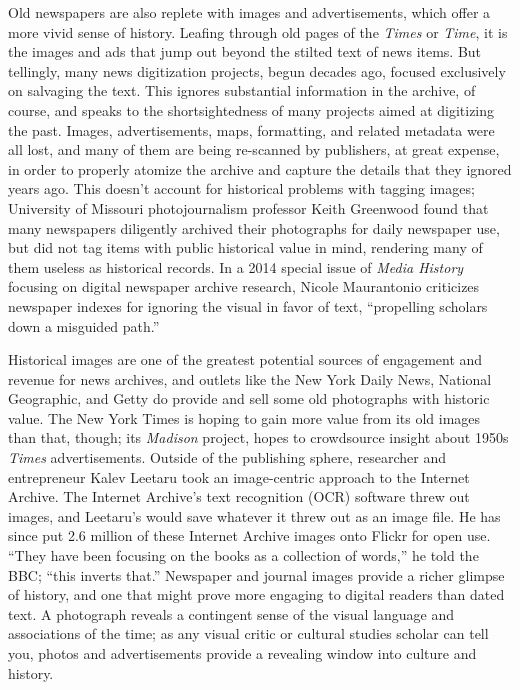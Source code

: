 Old newspapers are also replete with images and advertisements, which offer a more vivid sense of history. Leafing through old pages of the \emph{Times} or \emph{Time}, it is the images and ads that jump out beyond the stilted text of news items. But tellingly, many news digitization projects, begun decades ago, focused exclusively on salvaging the text. This ignores substantial information in the archive, of course, and speaks to the shortsightedness of many projects aimed at digitizing the past. Images, advertisements, maps, formatting, and related metadata were all lost, and many of them are being re-scanned by publishers, at great expense, in order to properly atomize the archive and capture the details that they ignored years ago. This doesn't account for historical problems with tagging images; University of Missouri photojournalism professor Keith Greenwood found that many newspapers diligently archived their photographs for daily newspaper use, but did not tag items with public historical value in mind, rendering many of them useless as historical records.\autocite{greenwood_digital_2011} In a 2014 special issue of \emph{Media History} focusing on digital newspaper archive research, Nicole Maurantonio criticizes newspaper indexes for ignoring the visual in favor of text, ``propelling scholars down a misguided path.''\autocite[90]{maurantonio_archiving_2014}

Historical images are one of the greatest potential sources of engagement and revenue for news archives, and outlets like the New York Daily News, National Geographic, and Getty do provide and sell some old photographs with historic value. The New York Times is hoping to gain more value from its old images than that, though; its \emph{Madison} project, hopes to crowdsource insight about 1950s \emph{Times} advertisements.\autocite{_new_????} Outside of the publishing sphere, researcher and entrepreneur Kalev Leetaru took an image-centric approach to the Internet Archive. The Internet Archive's text recognition (OCR) software threw out images, and Leetaru's would save whatever it threw out as an image file. He has since put 2.6 million of these Internet Archive images onto Flickr for open use. ``They have been focusing on the books as a collection of words,'' he told the BBC; ``this inverts that.''\autocite{kelion_millions_2014} Newspaper and journal images provide a richer glimpse of history, and one that might prove more engaging to digital readers than dated text. A photograph reveals a contingent sense of the visual language and associations of the time; as any visual critic or cultural studies scholar can tell you, photos and advertisements provide a revealing window into culture and history.

